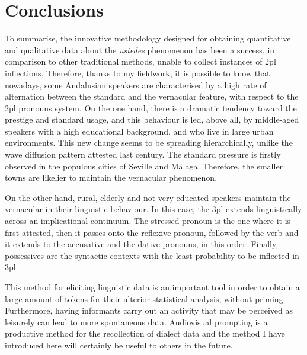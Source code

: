 \documentclass[output=paper]{LSP/langsci}
\begin{document}
\section{Conclusions}
To summarise, the innovative methodology designed for obtaining quantitative and qualitative data about the \textit{ustedes} phenomenon has been a success, in comparison to other traditional methods, unable to collect instances of 2pl inflections. Therefore, thanks to my fieldwork, it is possible to know that nowadays, some Andalusian speakers are characterised by a high rate of alternation between the standard and the vernacular feature, with respect to the 2pl pronouns system. On the one hand, there is a dramatic tendency toward the prestige and standard usage, and this behaviour is led, above all, by middle-aged speakers with a high educational background, and who live in large urban environments. This new change seems to be spreading hierarchically, unlike the wave diffusion pattern attested last century. The standard pressure is firstly observed in the populous cities of Seville and Málaga. Therefore, the smaller towns are likelier to maintain the vernacular phenomenon.

On the other hand, rural, elderly and not very educated speakers maintain the vernacular in their linguistic behaviour. In this case, the 3pl extends linguistically across an implicational continuum. The stressed pronoun is the one where it is first attested, then it passes onto the reflexive pronoun, followed by the verb and it extends to the accusative and the dative pronouns, in this order. Finally, possessives are the syntactic contexts with the least probability to be inflected in 3pl.

This method for eliciting linguistic data is an important tool in order to obtain a large amount of tokens for their ulterior statistical analysis, without priming. Furthermore, having informants carry out an activity that may be perceived as leisurely can lead to more spontaneous data. Audiovisual prompting is a productive method for the recollection of dialect data and the method I have introduced here will certainly be useful to others in the future.

\printbibliography[heading=subbibliography,notkeyword=this]
\end{document}
